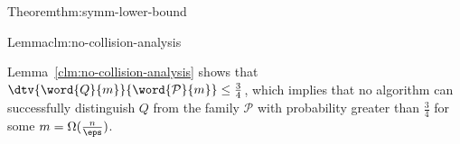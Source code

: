 \begin{prevproof}{Theorem}{thm:symm-lower-bound}
\begin{prevproof}{Lemma}{clm:no-collision-analysis}
\end{prevproof}


Lemma~\ref{clm:no-collision-analysis} shows that $\dtv{\word{Q}{m}}{\word{\mathcal{P}}{m}} \leq \frac{3}{4}$, which implies that
no algorithm can successfully distinguish $Q$ from the family $\mathcal{P}$ with probability greater than $\frac{3}{4}$ for some
$m=\Omega(\frac{n}{\eps})$.
\end{prevproof}

